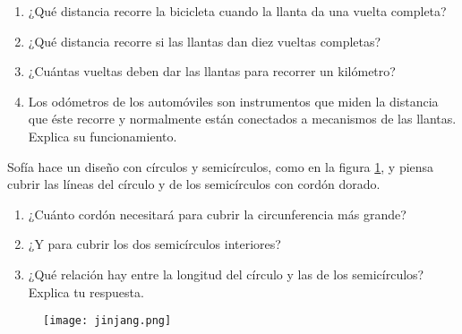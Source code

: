 \begin{enumerate}
\begin{minipage}[t]{0.7\textwidth}
              \begin{enumerate}
                  \item ¿Qué distancia recorre la bicicleta cuando la llanta da una vuelta completa?\\
                  \item ¿Qué distancia recorre si las llantas dan diez vueltas completas?\\
                  \item ¿Cuántas vueltas deben dar las llantas para recorrer un kilómetro?\\
                  \item Los odómetros de los automóviles son instrumentos que miden la distancia que éste
                        recorre y normalmente están conectados a mecanismos de las llantas. Explica su funcionamiento.
              \end{enumerate}
          \end{minipage}

          \begin{minipage}[t]{0.7\textwidth}
              \item Sofía hace un diseño con círculos y semicírculos, como en la figura \ref{fig:jinjang}, y piensa
              cubrir las líneas del círculo y de los semicírculos con cordón dorado.
              \begin{enumerate}
                  \item ¿Cuánto cordón necesitará para cubrir la circunferencia más grande?\\
                  \item ¿Y para cubrir los dos semicírculos interiores?\\
                  \item ¿Qué relación hay entre la longitud del círculo y las de los semicírculos? Explica tu respuesta.
              \end{enumerate}
          \end{minipage}\hfill
          \begin{minipage}[t]{0.2\textwidth}
              \begin{figure}[H]
                  \centering
                  \texttt{[image: jinjang.png]}
                  \label{fig:jinjang}
              \end{figure}
          \end{minipage}



\end{enumerate}
